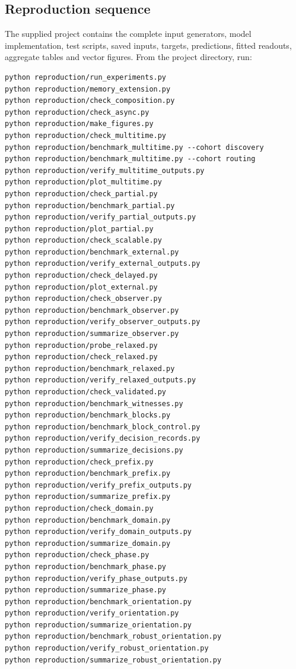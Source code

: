 \documentclass[11pt,a4paper]{article}
\theoremstyle{definition}\newtheorem{definition}[theorem]{Definition}
\begin{document}
\subsection{Reproduction sequence}
The supplied project contains the complete input generators, model implementation, test scripts, saved inputs, targets, predictions, fitted readouts, aggregate tables and vector figures. From the project directory, run:
\begin{verbatim}
python reproduction/run_experiments.py
python reproduction/memory_extension.py
python reproduction/check_composition.py
python reproduction/check_async.py
python reproduction/make_figures.py
python reproduction/check_multitime.py
python reproduction/benchmark_multitime.py --cohort discovery
python reproduction/benchmark_multitime.py --cohort routing
python reproduction/verify_multitime_outputs.py
python reproduction/plot_multitime.py
python reproduction/check_partial.py
python reproduction/benchmark_partial.py
python reproduction/verify_partial_outputs.py
python reproduction/plot_partial.py
python reproduction/check_scalable.py
python reproduction/benchmark_external.py
python reproduction/verify_external_outputs.py
python reproduction/check_delayed.py
python reproduction/plot_external.py
python reproduction/check_observer.py
python reproduction/benchmark_observer.py
python reproduction/verify_observer_outputs.py
python reproduction/summarize_observer.py
python reproduction/probe_relaxed.py
python reproduction/check_relaxed.py
python reproduction/benchmark_relaxed.py
python reproduction/verify_relaxed_outputs.py
python reproduction/check_validated.py
python reproduction/benchmark_witnesses.py
python reproduction/benchmark_blocks.py
python reproduction/benchmark_block_control.py
python reproduction/verify_decision_records.py
python reproduction/summarize_decisions.py
python reproduction/check_prefix.py
python reproduction/benchmark_prefix.py
python reproduction/verify_prefix_outputs.py
python reproduction/summarize_prefix.py
python reproduction/check_domain.py
python reproduction/benchmark_domain.py
python reproduction/verify_domain_outputs.py
python reproduction/summarize_domain.py
python reproduction/check_phase.py
python reproduction/benchmark_phase.py
python reproduction/verify_phase_outputs.py
python reproduction/summarize_phase.py
python reproduction/benchmark_orientation.py
python reproduction/verify_orientation.py
python reproduction/summarize_orientation.py
python reproduction/benchmark_robust_orientation.py
python reproduction/verify_robust_orientation.py
python reproduction/summarize_robust_orientation.py

\end{verbatim}
\end{document}
